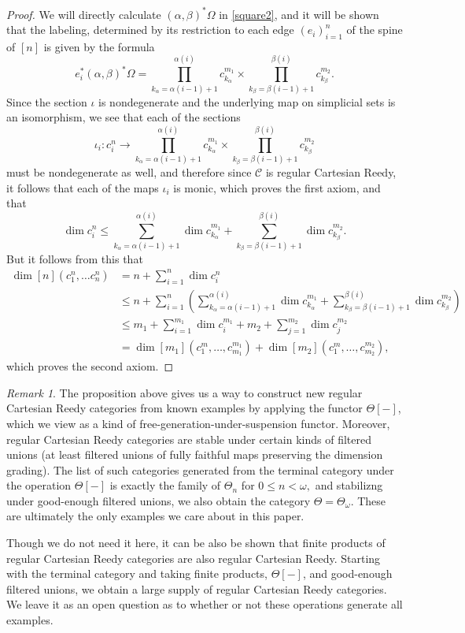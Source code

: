 \documentclass[leqno]{article}
\numberwithin{equation}{subsection}
\theoremstyle{plain}   %
\theoremstyle{remark}
\newtheorem{rem}[equation]{Remark}
\theoremstyle{plain}
\providecommand{\C}{}
\renewcommand{\C}{\ensuremath{\mathcal{C}}}
\begin{document}
\begin{proof}
	We will directly calculate \((\alpha,\beta)^\ast \Omega\) in \ref{square2}, and it will be shown that the labeling, determined by its restriction to each edge \((e_i)_{i=1}^n\) of the spine of \([n]\) is given by the formula
	\[
		e_i^\ast (\alpha,\beta)^\ast \Omega = \prod_{k_\alpha=\alpha(i-1)+1}^{\alpha(i)} c^{m_1}_{k_\alpha} \times \prod_{k_\beta=\beta(i-1)+1}^{\beta(i)} c^{m_2}_{k_\beta}.
	\] 
	Since the section \(\iota\) is nondegenerate and the underlying map on simplicial sets is an isomorphism,  we see that each of the sections 
	\[
		\iota_i:c^n_i \to \prod_{k_\alpha=\alpha(i-1)+1}^{\alpha(i)} c^{m_1}_{k_\alpha} \times \prod_{k_\beta=\beta(i-1)+1}^{\beta(i)} c^{m_2}_{k_\beta}
	\] 
	must be nondegenerate as well, and therefore since \(\C\) is regular Cartesian Reedy, it follows that each of the maps \(\iota_i\) is monic, which proves the first axiom, and that 
	\[
		\dim c^n_i \leq \sum_{k_\alpha=\alpha(i-1)+1}^{\alpha(i)} \dim c^{m_1}_{k_\alpha} + \sum_{k_\beta=\beta(i-1)+1}^{\beta(i)} \dim c^{m_2}_{k_\beta}.
	\]
	But it follows from this that 
	\begin{align*}
		\dim [n](c^n_1, \dots c^n_n) &= n + \sum_{i=1}^n \dim c^n_i\\
		&\leq n+ \sum_{i=1}^n \left(\sum_{k_\alpha=\alpha(i-1)+1}^{\alpha(i)} \dim c^{m_1}_{k_\alpha} + \sum_{k_\beta=\beta(i-1)+1}^{\beta(i)} \dim c^{m_2}_{k_\beta}\right)\\
		&\leq m_1 + \sum_{i=1}^{m_1} \dim c^{m_1}_i + m_2 + \sum_{j=1}^{m_2} \dim c^{m_2}_j\\
		&=\dim [m_1](c^m_1,\dots,c^{m_1}_{m_1}) + \dim [m_2](c^m_1,\dots,c^{m_2}_{m_2}),
	\end{align*}
	which proves the second axiom.
\end{proof}
\begin{rem}
	The proposition above gives us a way to construct new regular Cartesian Reedy categories from known examples by applying the functor \(\Theta[-]\), which we view as a kind of free-generation-under-suspension functor. Moreover, regular Cartesian Reedy categories are stable under certain kinds of filtered unions (at least filtered unions of fully faithful maps preserving the dimension grading). The list of such categories generated from the terminal category under the operation \(\Theta[-]\) is exactly the family of \(\Theta_n\) for \(0\leq n < \omega,\) and stabilizng under good-enough filtered unions, we also obtain the category \(\Theta=\Theta_\omega\).   These are ultimately the only examples we care about in this paper.
	
	Though we do not need it here, it can be also be shown that finite products of regular Cartesian Reedy categories are also regular Cartesian Reedy. Starting with the terminal category and taking finite products, \(\Theta[-]\), and good-enough filtered unions, we obtain a large supply of regular Cartesian Reedy categories.  We leave it as an open question as to whether or not these operations generate all examples. 
\end{rem}
\end{document}
